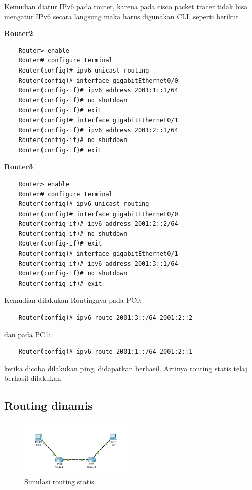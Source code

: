 Kemudian diatur IPv6 pada router, karena pada cisco packet tracer tidak bisa mengatur IPv6 secara langsung maka harus digunakan CLI, seperti berikut

\textbf{Router2}\\
\begin{verbatim}
	Router> enable
	Router# configure terminal
	Router(config)# ipv6 unicast-routing
	Router(config)# interface gigabitEthernet0/0
	Router(config-if)# ipv6 address 2001:1::1/64
	Router(config-if)# no shutdown
	Router(config-if)# exit
	Router(config)# interface gigabitEthernet0/1
	Router(config-if)# ipv6 address 2001:2::1/64
	Router(config-if)# no shutdown
	Router(config-if)# exit
\end{verbatim}
\textbf{Router3}
\begin{verbatim}
	Router> enable
	Router# configure terminal
	Router(config)# ipv6 unicast-routing
	Router(config)# interface gigabitEthernet0/0
	Router(config-if)# ipv6 address 2001:2::2/64
	Router(config-if)# no shutdown
	Router(config-if)# exit
	Router(config)# interface gigabitEthernet0/1
	Router(config-if)# ipv6 address 2001:3::1/64
	Router(config-if)# no shutdown
	Router(config-if)# exit
\end{verbatim}

Kemudian dilakukan Routingnya pada PC0:
\begin{verbatim}
	Router(config)# ipv6 route 2001:3::/64 2001:2::2
\end{verbatim}
dan pada PC1:
\begin{verbatim}
	Router(config)# ipv6 route 2001:1::/64 2001:2::1
\end{verbatim}
ketika dicoba dilakukan ping, didapatkan berhasil. Artinya routing statis telaj berhasil dilakukan

\subsection{Routing dinamis}
\begin{figure}[H]
	\centering
	\includegraphics[width=0.48\textwidth]{img/Topologidinamis.png}
	\caption{Simulasi routing statis}
	\label{fig:tumod2}
\end{figure}

